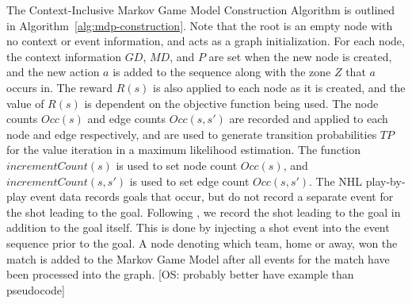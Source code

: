\documentclass[]{article}
\begin{document}
The Context-Inclusive Markov Game Model Construction Algorithm is outlined in Algorithm~\ref{alg:mdp-construction}. Note that the root is an empty node with no context or event information, and acts as a graph initialization. For each node, the context information $GD$, $MD$, and $P$ are set when the new node is created, and the new action $a$ is added to the sequence along with the zone $Z$ that $a$ occurs in. The reward $R(s)$ is also applied to each node as it is created, and the value of $R(s)$ is dependent on the objective function being used.  The node counts $Occ(s)$ and edge counts $Occ(s,s')$ are recorded and applied to each node and edge respectively, and are used to generate transition probabilities $TP$ for the value iteration in a maximum likelihood estimation. The function $incrementCount(s)$ is used to set node count $Occ(s)$, and $incrementCount(s,s')$ is used to set edge count $Occ(s,s')$. The NHL play-by-play event data records goals that occur, but do not record a separate event for the shot leading to the goal. Following \citep{Schuckers2013}, we record the shot leading to the goal in addition to the goal itself. This is done by injecting a shot event into the event sequence prior to the goal. A node denoting which team, home or away, won the match is added to the Markov Game Model after all events for the match have been processed into the graph.
[OS: probably better have example than pseudocode]
\end{document}
